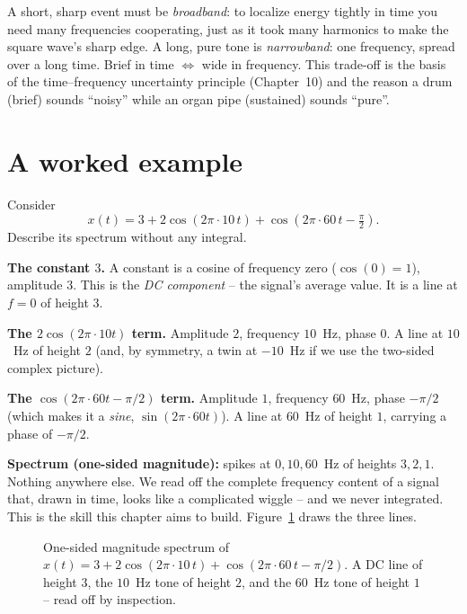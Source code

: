 \begin{intuitionbox}
A short, sharp event must be \emph{broadband}: to localize energy tightly in time you
need many frequencies cooperating, just as it took many harmonics to make the square
wave's sharp edge. A long, pure tone is \emph{narrowband}: one frequency, spread over
a long time. Brief in time $\Leftrightarrow$ wide in frequency. This trade-off is the
basis of the time--frequency uncertainty principle (Chapter~10) and the reason a drum
(brief) sounds ``noisy'' while an organ pipe (sustained) sounds ``pure''.
\end{intuitionbox}

\section{A worked example}

\begin{example}
\label{ch05:ex-inspect}
Consider
\[
  x(t) = 3 + 2\cos(2\pi\cdot 10\,t) + \cos(2\pi\cdot 60\,t - \tfrac{\pi}{2}).
\]
Describe its spectrum without any integral.

\textbf{The constant $3$.} A constant is a cosine of frequency zero ($\cos(0)=1$),
amplitude $3$. This is the \emph{DC component} -- the signal's average value. It is a
line at $f=0$ of height $3$.

\textbf{The $2\cos(2\pi\cdot 10 t)$ term.} Amplitude $2$, frequency $10$~Hz, phase
$0$. A line at $10$~Hz of height $2$ (and, by symmetry, a twin at $-10$~Hz if we use
the two-sided complex picture).

\textbf{The $\cos(2\pi\cdot 60 t - \pi/2)$ term.} Amplitude $1$, frequency $60$~Hz,
phase $-\pi/2$ (which makes it a \emph{sine}, $\sin(2\pi\cdot 60 t)$). A line at
$60$~Hz of height $1$, carrying a phase of $-\pi/2$.

\textbf{Spectrum (one-sided magnitude):} spikes at $0, 10, 60$~Hz of heights
$3, 2, 1$. Nothing anywhere else. We read off the complete frequency content of a
signal that, drawn in time, looks like a complicated wiggle -- and we never
integrated. This is the skill this chapter aims to build. Figure~\ref{ch05:ex-spectrum}
draws the three lines.
\end{example}

\begin{figure}[H]
\centering
{}
\caption{One-sided magnitude spectrum of
$x(t)=3+2\cos(2\pi\cdot 10\,t)+\cos(2\pi\cdot 60\,t-\pi/2)$. A DC line of height
$3$, the $10$~Hz tone of height $2$, and the $60$~Hz tone of height $1$ -- read off
by inspection.}
\label{ch05:ex-spectrum}
\end{figure}

